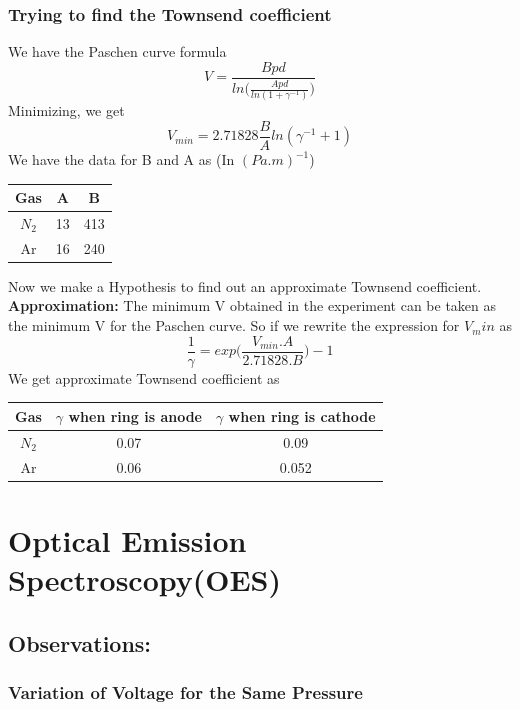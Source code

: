 \documentclass[]{report}[12 pt]
\begin{document}
\subsection*{Trying to find the Townsend coefficient}
We have the Paschen curve formula
\[V = \frac{Bpd}{ln\bigg(\frac{Apd}{ln(1+\gamma^{-1})}\bigg)}\]
Minimizing, we get
\[V_{min}=2.71828\frac{B}{A}ln(\gamma^{-1}+1)\]
We have the data for B and A as (In $(Pa .m)^{-1}$)\\
\begin{center}
	\begin{tabular}{|c|c|c|}
		\hline
		Gas & A & B \\
		\hline
		$N_2$ & 13 & 413 \\
		\hline
		Ar & 16 & 240 \\
		\hline
	\end{tabular}
\end{center}
Now we make a Hypothesis to find out an approximate Townsend coefficient.\\
\textbf{Approximation:} The minimum V obtained in the experiment can be taken as the minimum V for the Paschen curve.
So if we rewrite the expression for $V_min$ as
\[\frac{1}{\gamma}=exp\bigg(\frac{V_{min}.A}{2.71828.B} \bigg)-1\]
We get approximate Townsend coefficient as
\begin{center}
	\begin{tabular}{|c|c|c|}
		\hline
		Gas & $\gamma$ when ring is anode & $\gamma$ when ring is cathode \\
		\hline
		$N_2$ & 0.07  & 0.09  \\
		\hline
		Ar & 0.06 & 0.052 \\
		\hline
	\end{tabular}
\end{center}

\chapter{Optical Emission Spectroscopy(OES)}
\section{Observations:}
\subsection{Variation of Voltage for the Same Pressure}
\end{document}
